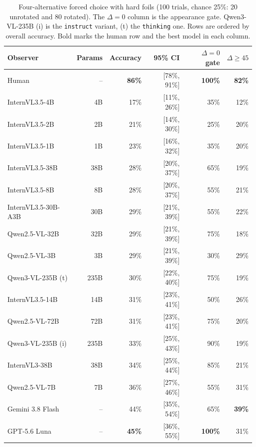 \begin{table}[t]
\centering
\small
\setlength{\tabcolsep}{6pt}
\begin{tabular}{@{}lrrrrr@{}}
\toprule
\textbf{Observer} & \textbf{Params} & \textbf{Accuracy} & \textbf{95\% CI} & \textbf{$\Delta\!=\!0$ gate} & \textbf{$\Delta\!\geq\!45$} \\
\midrule
Human & -- & \textbf{86\%} & [78\%, 91\%] & \textbf{100\%} & \textbf{82\%} \\
\midrule
InternVL3.5-4B & 4B & 17\% & [11\%, 26\%] & 35\% & 12\% \\
InternVL3.5-2B & 2B & 21\% & [14\%, 30\%] & 25\% & 20\% \\
InternVL3.5-1B & 1B & 23\% & [16\%, 32\%] & 35\% & 20\% \\
InternVL3.5-38B & 38B & 28\% & [20\%, 37\%] & 65\% & 19\% \\
InternVL3.5-8B & 8B & 28\% & [20\%, 37\%] & 55\% & 21\% \\
InternVL3.5-30B-A3B & 30B & 29\% & [21\%, 39\%] & 55\% & 22\% \\
Qwen2.5-VL-32B & 32B & 29\% & [21\%, 39\%] & 75\% & 18\% \\
Qwen2.5-VL-3B & 3B & 29\% & [21\%, 39\%] & 30\% & 29\% \\
Qwen3-VL-235B (t) & 235B & 30\% & [22\%, 40\%] & 75\% & 19\% \\
InternVL3.5-14B & 14B & 31\% & [23\%, 41\%] & 50\% & 26\% \\
Qwen2.5-VL-72B & 72B & 31\% & [23\%, 41\%] & 75\% & 20\% \\
Qwen3-VL-235B (i) & 235B & 33\% & [25\%, 43\%] & 90\% & 19\% \\
InternVL3-38B & 38B & 34\% & [25\%, 44\%] & 85\% & 21\% \\
Qwen2.5-VL-7B & 7B & 36\% & [27\%, 46\%] & 55\% & 31\% \\
Gemini 3.8 Flash & -- & 44\% & [35\%, 54\%] & 65\% & \textbf{39\%} \\
GPT-5.6 Luna & -- & \textbf{45\%} & [36\%, 55\%] & \textbf{100\%} & 31\% \\
\bottomrule
\end{tabular}
\caption{Four-alternative forced choice with hard foils (100 trials, chance 25\%: 20 unrotated and 80 rotated). The $\Delta=0$ column is the appearance gate. Qwen3-VL-235B (i) is the \texttt{instruct} variant, (t) the \texttt{thinking} one. Rows are ordered by overall accuracy. Bold marks the human row and the best model in each column.}
\label{tab:main}
\end{table}